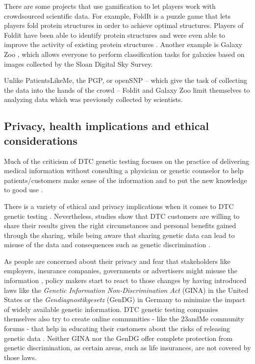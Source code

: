 \documentclass[10pt]{article}
\begin{document}
There are some projects that use gamification to let players work with crowdsourced scientific data. For example, FoldIt is a puzzle game that lets players fold protein structures in order to achieve optimal structures. Players of Foldit have been able to identify protein structures and were even able to improve the activity of existing protein structures \cite{Eiben2012}. Another example is Galaxy Zoo \cite{GalaxyZoo}, which allows everyone to perform classification tasks for galaxies based on images collected by the Sloan Digital Sky Survey. 

Unlike PatientsLikeMe, the PGP, or openSNP -- which give the task of collecting the data into the hands of the crowd -- Foldit and Galaxy Zoo limit themselves to analyzing data which was previously collected by scientists.  

\subsection*{Privacy, health implications and ethical considerations}

Much of the criticism of DTC genetic testing focuses on the practice 
of delivering medical information without consulting a physician or genetic counselor to help patients/customers make sense of the information and to put the new knowledge to good use \cite{Hauskeller2011,Hogarth2008,Wasson2009}.  

There is a variety of ethical and privacy implications when it comes to DTC genetic testing \cite{Caulfield2011,Joh2011,Joly2013}. Nevertheless, studies show that DTC customers are willing to share their results given the right circumstances and personal benefits gained through the sharing, while being aware that sharing genetic data can lead to misuse of the data and consequences such as genetic discrimination  \cite{Darst2013}. 

As people are concerned about their privacy and fear that stakeholders like employers, insurance companies, governments or advertisers might misuse the information \cite{Wolinsky2005}, policy makers start to react to those changes by having introduced laws like the 
\textit{Genetic Information Non-Discrimination Act} (GINA) in the United States or the \emph{Gendiagnostikgesetz} (GenDG) in Germany to minimize the impact of
widely available genetic information. DTC genetic testing companies themselves also try to create online communities - like the 23andMe community forums - that help in educating their customers about the risks of releasing genetic data \cite{Lee2009}. Neither GINA nor the GenDG offer complete protection from genetic discrimination, as certain areas, such as life insurances, are not covered by those laws.  
\end{document}
